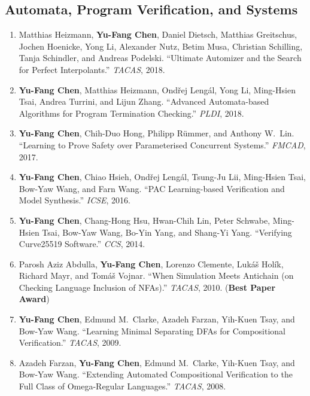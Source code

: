 \documentclass[11pt,a4paper]{article}
\newcommand{\myname}{\textbf{Yu-Fang Chen}}
\begin{document}
\subsection*{Automata, Program Verification, and Systems}
\begin{enumerate}[leftmargin=1.6em,itemsep=0.45em,resume]
  \item Matthias Heizmann, \myname, Daniel Dietsch, Matthias Greitschus,
  Jochen Hoenicke, Yong Li, Alexander Nutz, Betim Musa, Christian Schilling,
  Tanja Schindler, and Andreas Podelski.
  ``Ultimate Automizer and the Search for Perfect Interpolants.''
  \emph{TACAS}, 2018.

  \item \myname, Matthias Heizmann, Ondřej Lengál, Yong Li, Ming-Hsien Tsai,
  Andrea Turrini, and Lijun Zhang.
  ``Advanced Automata-based Algorithms for Program Termination Checking.''
  \emph{PLDI}, 2018.

  \item \myname, Chih-Duo Hong, Philipp Rümmer, and Anthony W.\ Lin.
  ``Learning to Prove Safety over Parameterised Concurrent Systems.''
  \emph{FMCAD}, 2017.

  \item \myname, Chiao Hsieh, Ondřej Lengál, Tsung-Ju Lii, Ming-Hsien Tsai,
  Bow-Yaw Wang, and Farn Wang.
  ``PAC Learning-based Verification and Model Synthesis.''
  \emph{ICSE}, 2016.

  \item \myname, Chang-Hong Hsu, Hwan-Chih Lin, Peter Schwabe,
  Ming-Hsien Tsai, Bow-Yaw Wang, Bo-Yin Yang, and Shang-Yi Yang.
  ``Verifying Curve25519 Software.'' \emph{CCS}, 2014.

  \item Parosh Aziz Abdulla, \myname, Lorenzo Clemente, Lukáš Holík,
  Richard Mayr, and Tomáš Vojnar.
  ``When Simulation Meets Antichain (on Checking Language Inclusion of NFAs).''
  \emph{TACAS}, 2010. (\textbf{Best Paper Award})

  \item \myname, Edmund M.\ Clarke, Azadeh Farzan, Yih-Kuen Tsay,
  and Bow-Yaw Wang.
  ``Learning Minimal Separating DFAs for Compositional Verification.''
  \emph{TACAS}, 2009.

  \item Azadeh Farzan, \myname, Edmund M.\ Clarke, Yih-Kuen Tsay,
  and Bow-Yaw Wang.
  ``Extending Automated Compositional Verification to the Full Class of
  Omega-Regular Languages.'' \emph{TACAS}, 2008.
\end{enumerate}
\end{document}
